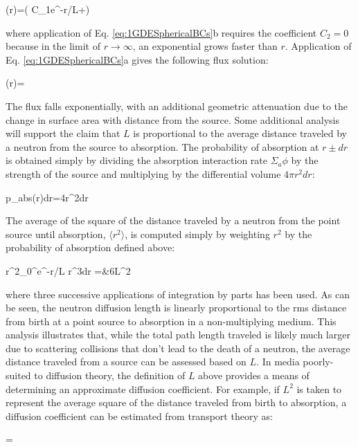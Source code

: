 \beq
\phi(r)=\left( C_1e^{-r/L}+\right)
\eeq

where application of Eq. \eqref{eq:1GDESphericalBCs}b requires the coefficient \(C_2=0\) because in the limit of \(r\rightarrow\infty\), an exponential grows faster than \(r\). Application of Eq. \eqref{eq:1GDESphericalBCs}a gives the following flux solution:

\beq
\phi(r)=
\eeq

The flux falls exponentially, with an additional geometric attenuation due to the change in surface area with distance from the source. Some additional analysis will support the claim that \(L\) is proportional to the average distance traveled by a neutron from the source to absorption. The probability of absorption at \(r\pm dr\) is obtained simply by dividing the absorption interaction rate \(\Sigma_a\phi\) by the strength of the source and multiplying by the differential volume \(4\pi r^2dr\):

\beq
p_{abs}(r)dr=4\pi r^2dr
\eeq

The average of the square of the distance traveled by a neutron from the point source until absorption, \(\langle r^2\rangle\), is computed simply by weighting \(r^2\) by the probability of absorption defined above:

\beqa
\langle r^2\rangle\equiv{}\int_{0}^\infty e^{-r/L} r^3dr
=&6L^2
\eeqa

where three successive applications of integration by parts has been used. As can be seen, the neutron diffusion length is linearly proportional to the \gls{rms} distance from birth at a point source to absorption in a non-multiplying medium. This analysis illustrates that, while the total path length traveled is likely much larger due to scattering collisions that don't lead to the death of a neutron, the average distance traveled from a source can be assessed based on \(L\). In media poorly-suited to diffusion theory, the definition of \(L\) above provides a means of determining an approximate diffusion coefficient. For example, if \(L^2\) is taken to represent the average square of the distance traveled from birth to absorption, a diffusion coefficient can be estimated from transport theory as:

\beq
{}=
\eeq


